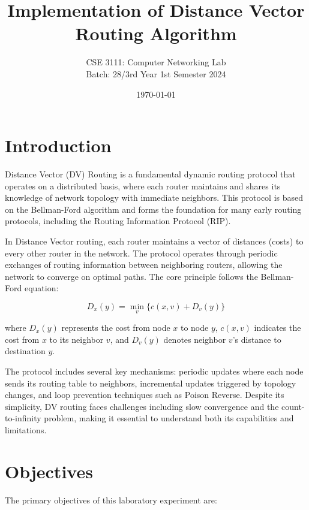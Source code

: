\documentclass[12pt,a4paper]{article}
\title{\textbf{Implementation of Distance Vector Routing Algorithm}}
\author{CSE 3111: Computer Networking Lab\\
Batch: 28/3rd Year 1st Semester 2024}
\date{\today}
\begin{document}
\maketitle

\section{Introduction}

Distance Vector (DV) Routing is a fundamental dynamic routing protocol that operates on a distributed basis, where each router maintains and shares its knowledge of network topology with immediate neighbors. This protocol is based on the Bellman-Ford algorithm and forms the foundation for many early routing protocols, including the Routing Information Protocol (RIP).

In Distance Vector routing, each router maintains a vector of distances (costs) to every other router in the network. The protocol operates through periodic exchanges of routing information between neighboring routers, allowing the network to converge on optimal paths. The core principle follows the Bellman-Ford equation:

\begin{equation}
D_x(y) = \min_v \{c(x,v) + D_v(y)\}
\end{equation}

where $D_x(y)$ represents the cost from node $x$ to node $y$, $c(x,v)$ indicates the cost from $x$ to its neighbor $v$, and $D_v(y)$ denotes neighbor $v$'s distance to destination $y$.

The protocol includes several key mechanisms: periodic updates where each node sends its routing table to neighbors, incremental updates triggered by topology changes, and loop prevention techniques such as Poison Reverse. Despite its simplicity, DV routing faces challenges including slow convergence and the count-to-infinity problem, making it essential to understand both its capabilities and limitations.

\section{Objectives}

The primary objectives of this laboratory experiment are:
\end{document}
